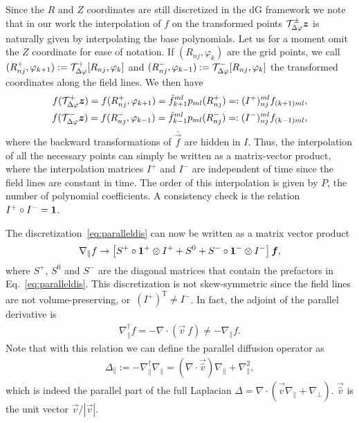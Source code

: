 Since the $R$ and $Z$ coordinates are still discretized in the dG framework we note that in our work
the interpolation of $f$ on the transformed points $\mathcal T^\pm_{\Delta\varphi}{\boldsymbol{z}}$
is naturally given by interpolating the base polynomials.
Let us for a moment omit the $Z$ coordinate for ease of notation.
If $(R_{nj}, \varphi_k)$ are the grid points,
we call $(R^+_{nj}, \varphi_{k+1}) := \mathcal T^+_{\Delta\varphi}[R_{nj}, \varphi_k]$ and
$(R_{nj}^-, \varphi_{k-1}) := \mathcal T^-_{\Delta\varphi}[R_{nj}, \varphi_k]$ the transformed coordinates along
the field lines. We then have
\begin{subequations}
\begin{align}
    f(\mathcal T^+_{\Delta\varphi}{\boldsymbol{z}}) = f( R^+_{nj}, \varphi_{k+1}) = \bar f_{k+1}^{ml}p_{ml}(R^+_{nj}) =: (I^+)_{nj}^{ml}f_{(k+1)ml} , \\
    f(\mathcal T^-_{\Delta\varphi}{\boldsymbol{z}}) = f( R^-_{nj}, \varphi_{k-1}) = \bar f_{k-1}^{ml}p_{ml}(R^-_{nj}) =: (I^-)_{nj}^{ml}f_{(k-1)ml} , 
\end{align}
\label{eq:interpolation}
\end{subequations}
where the backward transformations of $\bar{ \vec f}$ are hidden in $I$.
Thus, the interpolation of all the necessary points can simply be written as a matrix-vector product, where the interpolation matrices $I^+$  and $I^-$ are independent of time since
the field lines are constant in time. The order of this interpolation is given by $P$, the number of polynomial coefficients.
A consistency check is the relation $I^+\circ I^- = \mathbf{1}$.

The discretization~\eqref{eq:paralleldis} can now be written as a matrix vector product
\begin{align}
\nabla_\parallel f \rightarrow  \left[S^+ \circ \mathbf{1}^+\otimes I^+ + S^0  + S^-\circ \mathbf{1}^- \otimes I^-  \right] {\boldsymbol{f}},
    \label{}
\end{align}
where $S^+$, $S^0$ and $S^-$ are the diagonal matrices that contain the prefactors
in Eq.~\eqref{eq:paralleldis}.
This discretization is not skew-symmetric since the
field lines are not volume-preserving, or~$(I^+)^\mathrm{T} \neq I^-$.
In fact, the adjoint of the parallel derivative is
\begin{align}
    \nabla_\parallel^\dagger f = - \nabla\cdot(\vec v\ f ) \neq -\nabla_\parallel f.
    \label{}
\end{align}
Note that with this relation we can define the parallel
diffusion operator as
\begin{align}
    \Delta_\parallel := -\nabla_\parallel^\dagger \nabla_\parallel = (\nabla\cdot \vec{ \hat v}) \nabla_\parallel + \nabla_\parallel^2 , 
    \label{}
\end{align}
which is indeed the parallel part of the full Laplacian $\Delta = \nabla\cdot( \vec{ \hat v} \nabla_\parallel + \nabla_\perp)$.
$\vec{ \hat v} $ is the unit vector $\vec v/ |\vec v|$.

